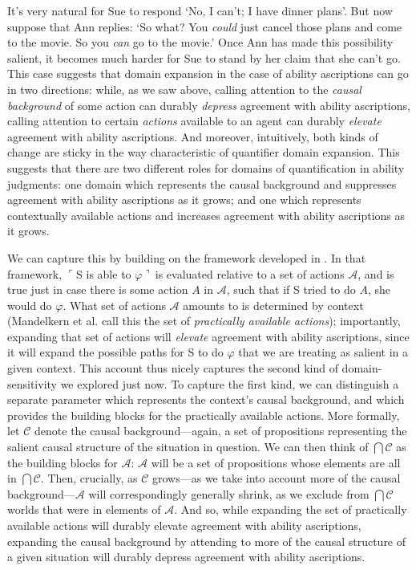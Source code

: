 \documentclass{salt}
\newcommand{\ul}{$\ulcorner$}
\newcommand{\ur}{$\urcorner\ $}
\begin{document}
\noindent  It's very natural for Sue to respond `No, I can't; I have dinner plans'. But now suppose that Ann replies: `So what? You \emph{could} just cancel those plans and come to the movie. So you \emph{can} go to the movie.' Once Ann has made this possibility salient, it becomes much harder for Sue to stand by her claim that she can't go. This case suggests that domain expansion in the case of ability ascriptions can go in two directions: while, as we saw above, calling attention to the \emph{causal background} of some action can durably \emph{depress} agreement with ability ascriptions, calling attention to certain  \emph{actions} available to an agent can durably \emph{elevate} agreement with ability ascriptions. And moreover, intuitively, both kinds of change are sticky in the way characteristic of quantifier domain expansion. This suggests that there are two different roles for domains of quantification in ability judgments: one domain which represents the causal background and suppresses agreement with ability ascriptions as it grows; and one which represents contextually available actions and increases agreement with ability ascriptions as it grows. 

We can capture this by building on the framework developed in \citealt{Mandelkern:2017b}. In that framework, \ul S is able to $\varphi$\ur is evaluated relative to a set of actions $\mathcal{A}$, and is true just in case there is some action $A$ in $\mathcal{A}$, such that if S tried to do $A$, she would do $\varphi$. What set of actions $\mathcal{A}$ amounts to is determined by context (Mandelkern et al. call this the set of \emph{practically available actions}); importantly, expanding that set of actions will \emph{elevate} agreement with ability ascriptions, since it will expand the possible paths for S to do $\varphi$ that we are treating as salient in a given context. This account thus nicely captures the second kind of domain-sensitivity we explored just now. To capture the first kind, we can distinguish  a separate parameter which represents the context's causal background, and which provides the building blocks for the practically available actions. More formally, let $\mathcal{C}$ denote the causal background---again, a set of propositions representing the salient causal structure of the situation in question. We can then think of $\bigcap\mathcal{C}$ as the building blocks for $\mathcal{A}$: $\mathcal{A}$ will be a set of propositions whose elements are all in $\bigcap\mathcal{C}$. Then, crucially, as $\mathcal{C}$ grows---as we take into account more of the causal background---$\mathcal{A}$ will correspondingly generally shrink, as we exclude from $\bigcap\mathcal{C}$ worlds that were in elements of $\mathcal{A}$. And so, while expanding the set of practically available actions will durably elevate agreement with ability ascriptions, expanding the causal background by attending to more of the causal structure of a given situation will durably depress agreement with ability ascriptions. 
\end{document}
